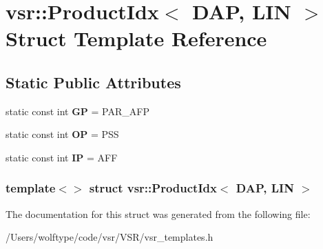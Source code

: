 \hypertarget{structvsr_1_1_product_idx_3_01_d_a_p_00_01_l_i_n_01_4}{\section{vsr\-:\-:Product\-Idx$<$ D\-A\-P, L\-I\-N $>$ Struct Template Reference}
\label{structvsr_1_1_product_idx_3_01_d_a_p_00_01_l_i_n_01_4}
}
\subsection*{Static Public Attributes}
\begin{DoxyCompactItemize}
\item 
\hypertarget{structvsr_1_1_product_idx_3_01_d_a_p_00_01_l_i_n_01_4_a3baf30714c1547a28d9b3e7af190b39f}{static const int {\bfseries G\-P} = P\-A\-R\-\_\-\-A\-F\-P}\label{structvsr_1_1_product_idx_3_01_d_a_p_00_01_l_i_n_01_4_a3baf30714c1547a28d9b3e7af190b39f}

\item 
\hypertarget{structvsr_1_1_product_idx_3_01_d_a_p_00_01_l_i_n_01_4_aac9396400839101f5688e64e0a2daff4}{static const int {\bfseries O\-P} = P\-S\-S}\label{structvsr_1_1_product_idx_3_01_d_a_p_00_01_l_i_n_01_4_aac9396400839101f5688e64e0a2daff4}

\item 
\hypertarget{structvsr_1_1_product_idx_3_01_d_a_p_00_01_l_i_n_01_4_ab408e790fd8c1473df072064ad95b396}{static const int {\bfseries I\-P} = A\-F\-F}\label{structvsr_1_1_product_idx_3_01_d_a_p_00_01_l_i_n_01_4_ab408e790fd8c1473df072064ad95b396}

\end{DoxyCompactItemize}
\subsubsection*{template$<$$>$ struct vsr\-::\-Product\-Idx$<$ D\-A\-P, L\-I\-N $>$}



The documentation for this struct was generated from the following file\-:\begin{DoxyCompactItemize}
\item 
/\-Users/wolftype/code/vsr/\-V\-S\-R/vsr\-\_\-templates.\-h\end{DoxyCompactItemize}
